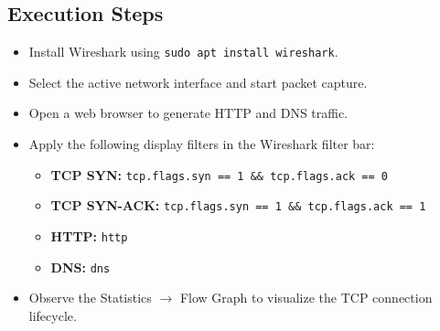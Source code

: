 \documentclass{article}
\begin{document}
\subsection{Execution Steps}
\begin{itemize}
    \item Install Wireshark using \texttt{sudo apt install wireshark}.
    \item Select the active network interface and start packet capture.
    \item Open a web browser to generate HTTP and DNS traffic.
    \item Apply the following display filters in the Wireshark filter bar:
    \begin{itemize}
        \item \textbf{TCP SYN:} \texttt{tcp.flags.syn == 1 \&\& tcp.flags.ack == 0}
        \item \textbf{TCP SYN-ACK:} \texttt{tcp.flags.syn == 1 \&\& tcp.flags.ack == 1}
        \item \textbf{HTTP:} \texttt{http}
        \item \textbf{DNS:} \texttt{dns}
    \end{itemize}
    \item Observe the Statistics $\rightarrow$ Flow Graph to visualize the TCP connection lifecycle.
\end{itemize}
\end{document}
